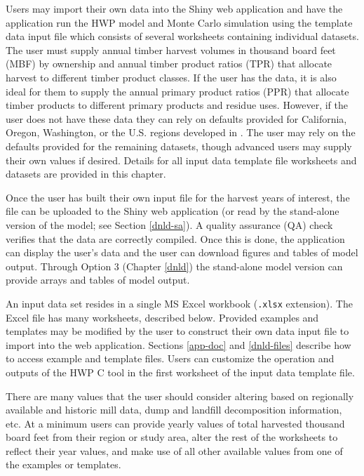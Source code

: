 \documentclass[
  openany]{book}
\begin{document}
Users may import their own data into the Shiny web application and have the application run the HWP model and Monte Carlo simulation using the template data input file which consists of several worksheets containing individual datasets. The user must supply annual timber harvest volumes in thousand board feet (MBF) by ownership and annual timber product ratios (TPR) that allocate harvest to different timber product classes. If the user has the data, it is also ideal for them to supply the annual primary product ratios (PPR) that allocate timber products to different primary products and residue uses. However, if the user does not have these data they can rely on defaults provided for California, Oregon, Washington, or the U.S. regions developed in \textcite{smith2006}. The user may rely on the defaults provided for the remaining datasets, though advanced users may supply their own values if desired. Details for all input data template file worksheets and datasets are provided in this chapter.

Once the user has built their own input file for the harvest years of interest, the file can be uploaded to the Shiny web application (or read by the stand-alone version of the model; see Section \ref{dnld-sa}). A quality assurance (QA) check verifies that the data are correctly compiled. Once this is done, the application can display the user's data and the user can download figures and tables of model output. Through Option 3 (Chapter \ref{dnld}) the stand-alone model version can provide arrays and tables of model output.

An input data set resides in a single MS Excel workbook (\texttt{.xlsx} extension). The Excel file has many worksheets, described below. Provided examples and templates may be modified by the user to construct their own data input file to import into the web application. Sections \ref{app-doc} and \ref{dnld-files} describe how to access example and template files. Users can customize the operation and outputs of the HWP C tool in the first worksheet of the input data template file.

There are many values that the user should consider altering based on regionally available and historic mill data, dump and landfill decomposition information, etc. At a minimum users can provide yearly values of total harvested thousand board feet from their region or study area, alter the rest of the worksheets to reflect their year values, and make use of all other available values from one of the examples or templates.
\end{document}
